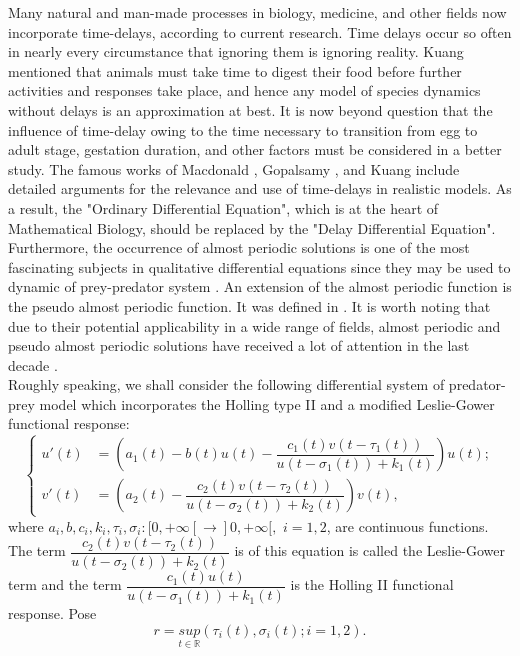 \documentclass[[a4paper,10pt]{article}
\newcommand{\R}{\mathbb{R}}
\begin{document}
Many natural and man-made processes in biology, medicine, and other fields now incorporate time-delays, according to current research. Time delays occur so often in nearly every circumstance that ignoring them is ignoring reality. Kuang \cite{kuang1993global} mentioned that animals must take time to digest their food before further activities and responses take place, and hence any model of species dynamics without delays is an approximation at best. It is now beyond question that the influence of time-delay owing to the time necessary to transition from egg to adult stage, gestation duration, and other factors must be considered in a better study. The famous works of Macdonald \cite{macdonald2008biological}, Gopalsamy \cite{gopalsamy1992stability}, and Kuang \cite{kuang1993global} include detailed arguments for the relevance and use of time-delays in realistic models. As a result, the "Ordinary Differential Equation", which is at the heart of Mathematical Biology, should be replaced by the "Delay Differential Equation".\\

Furthermore, the occurrence of almost periodic solutions is one of the most fascinating subjects in qualitative differential equations since they may be used to dynamic of prey-predator system \cite{liao2018almost,menouer2017existence,tripathi2020almost,xu2019global}. An extension of the almost periodic function is the pseudo almost  periodic function. It was defined in \cite{zhang1994pseudo}. 
It is worth noting that due to their potential applicability in a wide range of fields, almost periodic and pseudo almost periodic solutions have received a lot of attention in the last decade \cite{amdouni2018pseudo,bekolle2021attractiveness,chen2016positive}.\\

Roughly speaking, we shall consider  the following differential system of predator-prey model which incorporates the Holling type II and a modified Leslie-Gower functional response:
\begin{equation}\label{prey-predatorII}
\left \{\begin{aligned}
u'(t)&=\left(a_1(t)-b(t)u(t)-\dfrac{c_1(t)v(t-\tau_1(t))}{u(t-\sigma_1(t))+k_1(t)}\right)u(t);\\
v'(t)&=\left(a_2(t)-\dfrac{c_2(t)v(t-\tau_2(t))}{u(t-\sigma_2(t))+k_2(t)}\right)v(t), 
\end{aligned}
\right. 
\end{equation}
where $a_i,b,c_i,k_i,\tau_i,\sigma_i:[0,+\infty[\rightarrow ]0,+\infty[,$ $i=1,2$, are continuous functions. The term {\small$\dfrac{c_2(t)v(t-\tau_2(t))}{u(t-\sigma_2(t))+k_2(t)}$} is of this equation is called the Leslie-Gower
term and the term {\small$\dfrac{c_1(t)u(t)}{u(t-\sigma_1(t))+k_1(t)}$ } is the Holling II functional response. Pose $$r =\underset{t \in \R}{sup} \left(\tau_i(t),\sigma_i(t) ; i=1,2\right).$$
\end{document}
